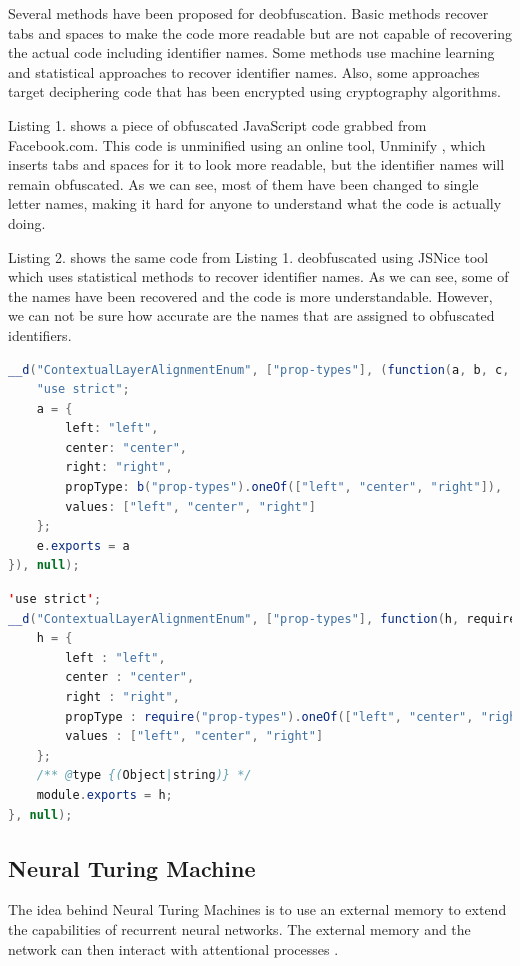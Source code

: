 \documentclass[acmsmall]{acmart}
\begin{document}
Several methods have been proposed for deobfuscation. Basic methods recover tabs and spaces to make the code more readable but are not capable of recovering the actual code including identifier names. Some methods use machine learning and statistical approaches to recover identifier names. Also, some approaches target deciphering code that has been encrypted using cryptography algorithms.

Listing 1. shows a piece of obfuscated JavaScript code grabbed from Facebook.com. This code is unminified using an online tool, Unminify \cite{unminify}, which inserts tabs and spaces for it to look more readable, but the identifier names will remain obfuscated. As we can see, most of them have been changed to single letter names, making it hard for anyone to understand what the code is actually doing.

Listing 2. shows the same code from Listing 1. deobfuscated using JSNice \cite{jsnice} tool which uses statistical methods to recover identifier names. As we can see, some of the names have been recovered and the code is more understandable. However, we can not be sure how accurate are the names that are assigned to obfuscated identifiers.

\begin{lstlisting}[language=Java,caption={An obfuscated JavaScript code from facebook.com}]
__d("ContextualLayerAlignmentEnum", ["prop-types"], (function(a, b, c, d, e, f) {
	"use strict";
	a = {
		left: "left",
		center: "center",
		right: "right",
		propType: b("prop-types").oneOf(["left", "center", "right"]),
		values: ["left", "center", "right"]
	};
	e.exports = a
}), null);
\end{lstlisting}

\begin{lstlisting}[language=Java,caption={Deobfuscated JavaScript code from Listing 1. using JsNice\cite{jsnice} tool}]
'use strict';
__d("ContextualLayerAlignmentEnum", ["prop-types"], function(h, require, canCreateDiscussions, isSlidingUp, module, dontForceConstraints) {
	h = {
		left : "left",
		center : "center",
		right : "right",
		propType : require("prop-types").oneOf(["left", "center", "right"]),
		values : ["left", "center", "right"]
	};
	/** @type {(Object|string)} */
	module.exports = h;
}, null);
\end{lstlisting}




\subsection{Neural Turing Machine}
The idea behind Neural Turing Machines is to use an external memory to extend the capabilities of recurrent neural networks. The external memory and the network can then interact with attentional processes \cite{}.
\end{document}
